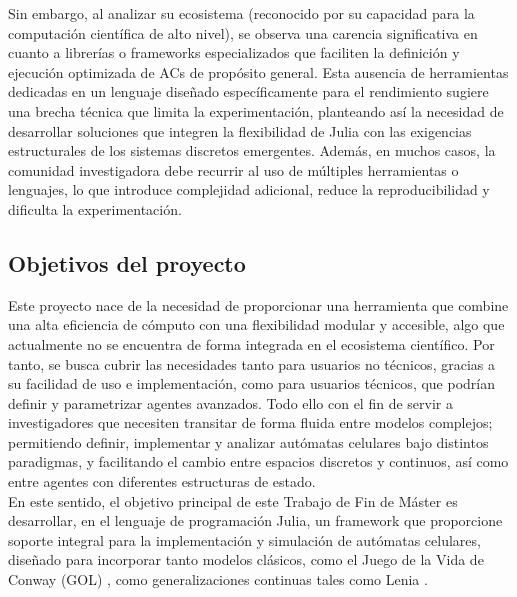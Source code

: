 \documentclass[runningheads]{llncs}
\begin{document}
Sin embargo, al analizar su ecosistema (reconocido por su capacidad para la computación científica de alto nivel), se observa una carencia significativa en cuanto a librerías o frameworks especializados que faciliten la definición y ejecución optimizada de ACs de propósito general. Esta ausencia de herramientas dedicadas en un lenguaje diseñado específicamente para el rendimiento sugiere una brecha técnica que limita la experimentación, planteando así la necesidad de desarrollar soluciones que integren la flexibilidad de Julia con las exigencias estructurales de los sistemas discretos emergentes. Además, en muchos casos, la comunidad investigadora debe recurrir al uso de múltiples herramientas o lenguajes, lo que introduce complejidad adicional, reduce la reproducibilidad y dificulta la experimentación.

\subsection{Objetivos del proyecto}
Este proyecto nace de la necesidad de proporcionar una herramienta que combine una alta eficiencia de cómputo con una flexibilidad modular y accesible, algo que actualmente no se encuentra de forma integrada en el ecosistema científico. Por tanto, se busca cubrir las necesidades tanto para usuarios no técnicos, gracias a su facilidad de uso e implementación, como para usuarios técnicos, que podrían definir y parametrizar agentes avanzados. Todo ello con el fin de servir a investigadores que necesiten transitar de forma fluida entre modelos complejos; permitiendo definir, implementar y analizar autómatas celulares bajo distintos paradigmas, y facilitando el cambio entre espacios discretos y continuos, así como entre agentes con diferentes estructuras de estado.\\

En este sentido, el objetivo principal de este Trabajo de Fin de Máster es desarrollar, en el lenguaje de programación Julia, un framework que proporcione soporte integral para la implementación y simulación de autómatas celulares, diseñado para incorporar tanto modelos clásicos, como el Juego de la Vida de Conway (GOL) \cite{ref_gol}, como generalizaciones continuas tales como Lenia \cite{ref_lenia}.\\
\end{document}
